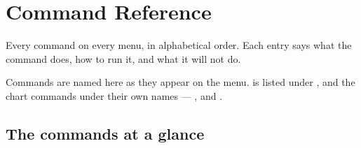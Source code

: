 \chapter{Command Reference}
\label{ch:cmdref}

Every command on every menu, in alphabetical order. Each entry says what the
command does, how to run it, and what it will not do.

Commands are named here as they appear on the menu. 
is listed under , and the chart commands under their own
names --- ,  and .

\section{The commands at a glance}

